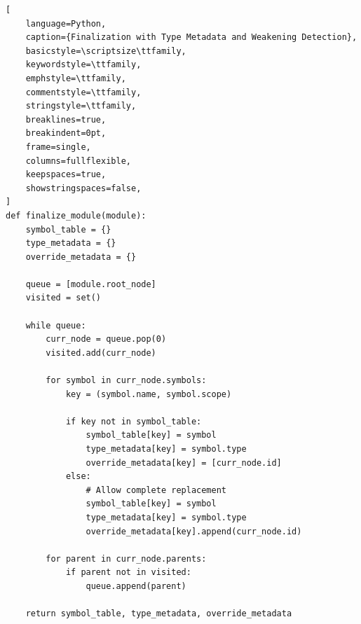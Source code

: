 \documentclass[sigplan,screen]{acmart}
\begin{document}
\begin{lstlisting}[
    language=Python,
    caption={Finalization with Type Metadata and Weakening Detection},
    basicstyle=\scriptsize\ttfamily,
    keywordstyle=\ttfamily,
    emphstyle=\ttfamily,
    commentstyle=\ttfamily,
    stringstyle=\ttfamily,
    breaklines=true,
    breakindent=0pt,
    frame=single,
    columns=fullflexible,
    keepspaces=true,
    showstringspaces=false,
]
def finalize_module(module):
    symbol_table = {}
    type_metadata = {}
    override_metadata = {}

    queue = [module.root_node]
    visited = set()

    while queue:
        curr_node = queue.pop(0)
        visited.add(curr_node)

        for symbol in curr_node.symbols:
            key = (symbol.name, symbol.scope)

            if key not in symbol_table:
                symbol_table[key] = symbol
                type_metadata[key] = symbol.type
                override_metadata[key] = [curr_node.id]
            else:
                # Allow complete replacement
                symbol_table[key] = symbol
                type_metadata[key] = symbol.type
                override_metadata[key].append(curr_node.id)

        for parent in curr_node.parents:
            if parent not in visited:
                queue.append(parent)

    return symbol_table, type_metadata, override_metadata
\end{lstlisting}
\end{document}
